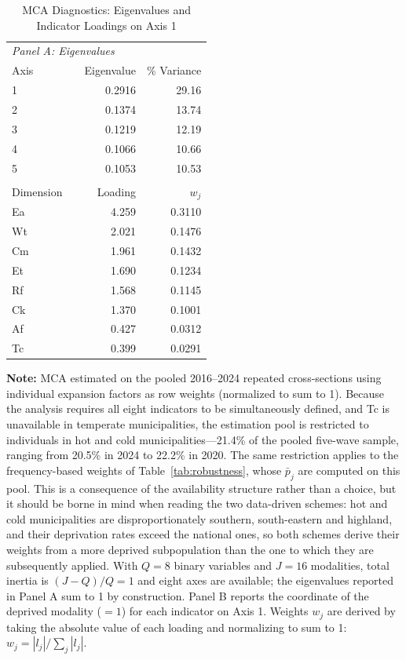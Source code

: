 \documentclass[11pt, a4paper]{article}
\begin{document}
\begin{table}[htb]
\centering
\caption{MCA Diagnostics: Eigenvalues and Indicator Loadings on Axis 1}
\small
\begin{tabularx}{\textwidth}{l X rr}
\toprule
\toprule
\multicolumn{4}{l}{\textit{Panel A: Eigenvalues}} \\[2pt]
Axis & & Eigenvalue & \% Variance \\ \midrule
1 & & 0.2916 & 29.16 \\
2 & & 0.1374 & 13.74 \\
3 & & 0.1219 & 12.19 \\
4 & & 0.1066 & 10.66 \\
5 & & 0.1053 & 10.53 \\
\addlinespace
\multicolumn{4}{l}{\textit{Panel B: Deprived modality loadings on Axis 1 and derived weights}} \\[2pt]
Dimension & & Loading & $w_j$ \\ \midrule
Ea & & 4.259 & 0.3110 \\
Wt & & 2.021 & 0.1476 \\
Cm & & 1.961 & 0.1432 \\
Et & & 1.690 & 0.1234 \\
Rf & & 1.568 & 0.1145 \\
Ck & & 1.370 & 0.1001 \\
Af & & 0.427 & 0.0312 \\
Tc & & 0.399 & 0.0291 \\
\bottomrule
\end{tabularx}
\begin{justify}
\scriptsize
\textbf{Note:} MCA estimated on the pooled 2016--2024 repeated cross-sections using individual expansion factors as row weights (normalized to sum to 1). Because the analysis requires all eight indicators to be simultaneously defined, and Tc is unavailable in temperate municipalities, the estimation pool is restricted to individuals in hot and cold municipalities---21.4\% of the pooled five-wave sample, ranging from 20.5\% in 2024 to 22.2\% in 2020. The same restriction applies to the frequency-based weights of Table~\ref{tab:robustness}, whose $\bar p_j$ are computed on this pool. This is a consequence of the availability structure rather than a choice, but it should be borne in mind when reading the two data-driven schemes: hot and cold municipalities are disproportionately southern, south-eastern and highland, and their deprivation rates exceed the national ones, so both schemes derive their weights from a more deprived subpopulation than the one to which they are subsequently applied. With $Q=8$ binary variables and $J=16$ modalities, total inertia is $(J-Q)/Q = 1$ and eight axes are available; the eigenvalues reported in Panel A sum to 1 by construction. Panel B reports the coordinate of the deprived modality ($=1$) for each indicator on Axis 1. Weights $w_j$ are derived by taking the absolute value of each loading and normalizing to sum to 1: $w_j = |l_j| / \sum_j |l_j|$.
\smallskip


\end{justify}
\end{table}
\end{document}
